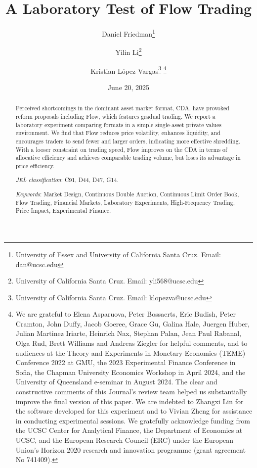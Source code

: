 \documentclass[12pt]{article}
\title{A Laboratory Test of Flow Trading}
\author{
  Daniel Friedman\thanks{
  University of Essex and University of California Santa Cruz. Email: dan@ucsc.edu} 
\and
  Yilin Li\thanks{
  University of California Santa Cruz. Email: yli568@ucsc.edu} 
\and
  Kristian L\'opez Vargas\thanks{
  University of California Santa Cruz. Email: klopezva@ucsc.edu}
  \thanks{
We are grateful to Elena Asparuova, Peter Bossaerts, Eric Budish, Peter Cramton, John Duffy,  Jacob Goeree, Grace Gu, Galina Hale, Juergen Huber, Julian Martinez Iriarte, Heinrich Nax, Stephan Palan,  Jean Paul Rabanal, Olga Rud, Brett Williams and  Andreas Ziegler
for helpful comments,  
and to audiences at the Theory and Experiments in Monetary Economics (TEME) Conference 2022 at GMU, the 2023 Experimental Finance Conference in Sofia, the Chapman University Economics Workshop in April 2024, and the University of Queensland e-seminar in August 2024.
The clear and constructive comments of this Journal's review team helped us substantially improve the final version of this paper.
We are indebted to Zhangxi Lin for the software developed for this experiment and to Vivian Zheng for assistance in conducting experimental sessions. We gratefully acknowledge funding from the UCSC Center for Analytical Finance, the Department of Economics at UCSC, and the European Research Council (ERC) under the European Union’s Horizon 2020 research and innovation programme (grant agreement No 741409).}
}
\date{June 20, 2025}
\begin{document}
\maketitle

\vspace{-.4in}
\begin{abstract}
\begin{singlespace}
Perceived shortcomings in the dominant asset market format, CDA, have provoked reform proposals including Flow, which features gradual trading. 
We report a laboratory experiment comparing formats in a simple single-asset private values environment. 
We find that Flow reduces price volatility, enhances liquidity, and encourages traders to send fewer and larger orders, indicating more effective shredding. With a looser constraint on trading speed, Flow improves on the CDA in terms of allocative efficiency and achieves comparable trading volume, but loses its advantage in price efficiency. 
\bigskip

\noindent\textit{JEL classification}: C91, D44, D47, G14.

\noindent \textit{Keywords}: Market Design, Continuous Double Auction, Continuous Limit Order Book, Flow Trading, Financial Markets, Laboratory Experiments, High-Frequency Trading, Price Impact, Experimental Finance.

\end{singlespace}
\end{abstract}
\end{document}
